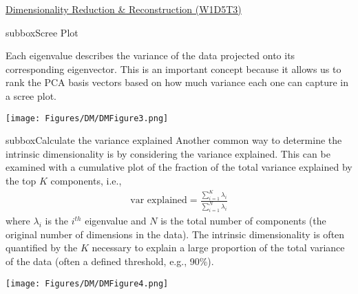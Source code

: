 \begin{textbox}{\href{https://compneuro.neuromatch.io/tutorials/W1D5_DimensionalityReduction/student/W1D5_Tutorial3.html}{Dimensionality Reduction \& Reconstruction (W1D5T3)} }
\begin{subbox}{subbox}{Scree Plot}
\scriptsize

Each eigenvalue describes the variance of the data projected onto its corresponding eigenvector. This is an important concept because it allows us to rank the PCA basis vectors based on how much variance each one can capture in a scree plot.

\centering
\texttt{[image: Figures/DM/DMFigure3.png]}

\end{subbox}

\begin{subbox}{subbox}{Calculate the variance explained
}
\scriptsize
Another common way to determine the intrinsic dimensionality is by considering the variance explained. This can be examined with a cumulative plot of the fraction of the total variance explained by the top $K$ components, i.e.,
\begin{align}
\text{var explained} = \frac{\sum_{i=1}^K \lambda_i}{\sum_{i=1}^N \lambda_i}
\end{align}
where $\lambda_i$ is the $i^{th}$ eigenvalue and $N$ is the total number of components (the original number of dimensions in the data).
The intrinsic dimensionality is often quantified by the $K$ necessary to explain a large proportion of the total variance of the data (often a defined threshold, e.g., 90\%).

\centering
\texttt{[image: Figures/DM/DMFigure4.png]}

\end{subbox}

\end{textbox}
